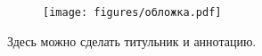 
\begin{figure}
    \texttt{[image: figures/обложка.pdf]}
\end{figure}

\restoregeometry
\clearpage


Здесь можно сделать титульник и аннотацию. 


\newpage
